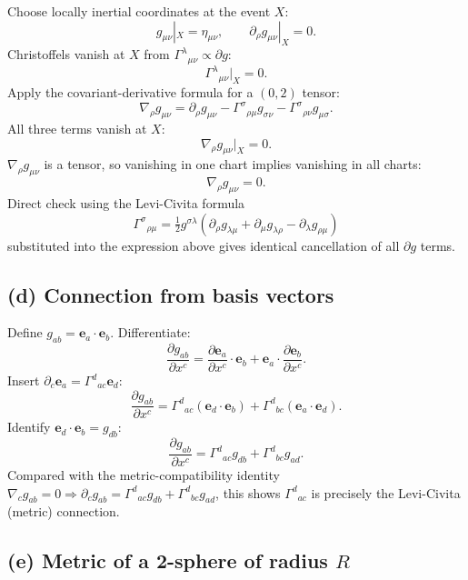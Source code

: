 \documentclass[11pt]{article}
\newcommand{\pd}[2]{\frac{\partial #1}{\partial #2}}
\begin{document}
Choose locally inertial coordinates at the event $X$:
\[ g_{\mu\nu}|_X=\eta_{\mu\nu},\qquad \partial_\rho g_{\mu\nu}|_X=0. \]
Christoffels vanish at $X$ from $\Gamma^\lambda{}_{\mu\nu}\propto\partial g$:
\[ \Gamma^\lambda{}_{\mu\nu}|_X=0. \]
Apply the covariant-derivative formula for a $(0,2)$ tensor:
\[ \nabla_\rho g_{\mu\nu}=\partial_\rho g_{\mu\nu}-\Gamma^\sigma{}_{\rho\mu}g_{\sigma\nu}-\Gamma^\sigma{}_{\rho\nu}g_{\mu\sigma}. \]
All three terms vanish at $X$:
\[ \nabla_\rho g_{\mu\nu}|_X=0. \]
$\nabla_\rho g_{\mu\nu}$ is a tensor, so vanishing in one chart implies vanishing in all charts:
\begin{equation}
\boxed{\;\nabla_\rho g_{\mu\nu}=0.\;}
\label{eq:metric-compat}
\end{equation}
Direct check using the Levi-Civita formula
\[ \Gamma^\sigma{}_{\rho\mu}=\tfrac12 g^{\sigma\lambda}\!\left(\partial_\rho g_{\lambda\mu}+\partial_\mu g_{\lambda\rho}-\partial_\lambda g_{\rho\mu}\right) \]
substituted into the expression above gives identical cancellation of all $\partial g$ terms.

\subsection*{(d) Connection from basis vectors}

Define $g_{ab}=\bm e_a\!\cdot\!\bm e_b$. Differentiate:
\[ \pd{g_{ab}}{x^c}=\pd{\bm e_a}{x^c}\!\cdot\!\bm e_b+\bm e_a\!\cdot\!\pd{\bm e_b}{x^c}. \]
Insert $\partial_c\bm e_a=\Gamma^d{}_{ac}\bm e_d$:
\[ \pd{g_{ab}}{x^c}=\Gamma^d{}_{ac}(\bm e_d\!\cdot\!\bm e_b)+\Gamma^d{}_{bc}(\bm e_a\!\cdot\!\bm e_d). \]
Identify $\bm e_d\!\cdot\!\bm e_b=g_{db}$:
\begin{equation}
\boxed{\;\pd{g_{ab}}{x^c}=\Gamma^d{}_{ac}g_{db}+\Gamma^d{}_{bc}g_{ad}.\;}
\label{eq:dg-Gamma}
\end{equation}
Compared with the metric-compatibility identity $\nabla_c g_{ab}=0\Rightarrow \partial_c g_{ab}=\Gamma^d{}_{ac}g_{db}+\Gamma^d{}_{bc}g_{ad}$, this shows $\Gamma^d{}_{ac}$ is precisely the Levi-Civita (metric) connection.

\subsection*{(e) Metric of a 2-sphere of radius $R$}
\end{document}
